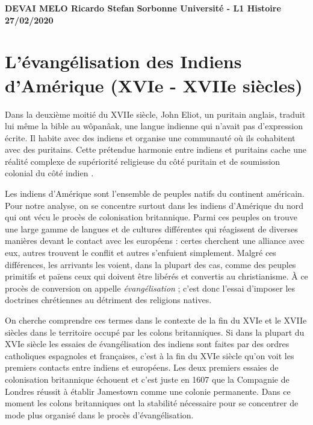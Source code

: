 \documentclass[12pt]{article}
\begin{document}
\begin{flushright}
\textbf{DEVAI MELO Ricardo Stefan}
\linebreak
\textbf{Sorbonne Université - L1 Histoire}
\linebreak
\textbf{27/02/2020}
\linebreak
\end{flushright}

\section*{L'évangélisation des Indiens d'Amérique (XVIe - XVIIe siècles)}

Dans la deuxième moitié du XVIIe siècle, John Eliot, un puritain anglais, traduit lui même la bible au wôpanâak, une langue indienne qui n'avait pas d'expression écrite. Il habite avec des indiens et organise une communauté où ils cohabitent avec des puritains. Cette prétendue harmonie entre indiens et puritains cache une réalité complexe de supériorité religieuse du côté puritain et de soumission colonial du côté indien \cite{eliot2-1}.

Les indiens d'Amérique sont l'ensemble de peuples natifs du continent américain. Pour notre analyse, on se concentre surtout dans les indiens d'Amérique du nord qui ont vécu le procès de colonisation britannique. Parmi ces peuples on trouve une large gamme de langues et de cultures différentes qui réagissent de diverses manières devant le contact avec les européens : certes cherchent une alliance avec eux, autres trouvent le conflit et autres s'enfuient simplement. Malgré ces différences, les arrivants les voient, dans la plupart des cas, comme des peuples primitifs et païens ceux qui doivent être libérés et convertis au christianisme. À ce procès de conversion on appelle \emph{évangélisation} ; c'est donc l'essai d'imposer les doctrines chrétiennes au détriment des religions natives.

On cherche comprendre ces termes dans le contexte de la fin du XVIe et le XVIIe siècles dans le territoire occupé par les colons britanniques. Si dans la plupart du XVIe siècle les essaies de évangélisation des indiens sont faites par des ordres catholiques espagnoles et françaises, c'est à la fin du XVIe siècle qu'on voit les premiers contacts entre indiens et européens. Les deux premiers essaies de colonisation britannique échouent et c'est juste en 1607 que la Compagnie de Londres réussit à établir Jamestown comme une colonie permanente. Dans ce moment les colons britanniques ont la stabilité nécessaire pour se concentrer de mode plus organisé dans le procès d'évangélisation.
\end{document}
